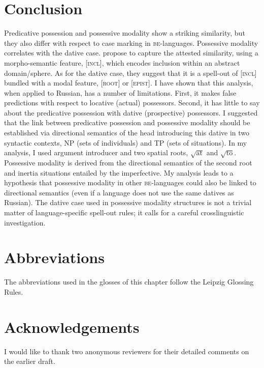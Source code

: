 \documentclass[output=paper,colorlinks,citecolor=brown,modfonts,nonflat]{langsci/langscibook}
\begin{document}
\section{Conclusion}\label{sec:tsedryk:5}

Predicative possession and possessive modality show a striking similarity, but they also differ with respect to case marking in \textsc{be}{}-languages. Possessive modality correlates with the dative case. \citet{BjorkmanCowper2016} propose to capture the attested similarity, using a morpho-semantic feature, [\textsc{incl}], which encodes inclusion within an abstract domain/sphere. As for the dative case, they suggest that it is a spell-out of [\textsc{incl}] bundled with a modal feature, [\textsc{root}] or [\textsc{epist}]. I have shown that this analysis, when applied to Russian, has a number of limitations. First, it makes false predictions with respect to locative (actual) possessors. Second, it has little to say about the predicative possession with dative (prospective) possessors. I suggested that the link between predicative possession and possessive modality should be established via directional semantics of the head introducing this dative in two syntactic contexts, NP (sets of individuals) and TP (sets of situations). In my analysis, I used  argument introducer and two spatial roots,  $\sqrt{\text{at}}$  and  $\sqrt{\text{to}}$. Possessive modality is derived from the directional semantics of the second root and inertia situations entailed by the imperfective. My analysis leads to a hypothesis that possessive modality in other \textsc{be}{}-languages could also be linked to directional semantics (even if a language does not use the same datives as Russian). The dative case used in possessive modality structures is not a trivial matter of language-specific spell-out rules; it calls for a careful crosslinguistic investigation.



\section*{Abbreviations}
The abbreviations used in the glosses of this chapter follow the Leipzig Glossing Rules.

\section*{Acknowledgements}

I would like to thank two anonymous reviewers for their detailed comments on the earlier draft.

\sloppy\printbibliography[heading=subbibliography,notkeyword=this]
\end{document}
